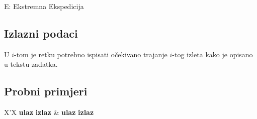 \begin{statement}[
  timelimit=1 s,
  memorylimit=512 MiB,
]{E: Ekstremna Ekspedicija}
\subsection*{Izlazni podaci}
U $i$-tom je retku potrebno ispisati očekivano trajanje $i$-tog izleta kako
je opisano u tekstu zadatka.

\subsection*{Probni primjeri}
\begin{tabularx}{\textwidth}{X'X}
  \textbf{ulaz}
  \linespread{1}{}
  \textbf{izlaz}
  \linespread{1}{} &
  \textbf{ulaz}
  \linespread{1}{}
  \textbf{izlaz}
  \linespread{1}{}
\end{tabularx}

\end{statement}

